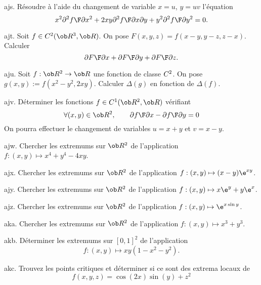 \exo [Level=2,Fight=2,Learn=1,Field=\EquationsAuxDérivéesPartielles,Type=\Exercices,Origin=] ajs. 
Résoudre à l'aide du changement de variable $x=u$, $y=uv$ l'équation 
$$
x^2{\partial^2f\F\partial x^2}+2xy{\partial^2f\F\partial x\partial y}+y^2{\partial^2f\F\partial y^2}=0.
$$


\exo [Level=2,Fight=0,Learn=0,Field=\FonctionsDePlusieursVariables,Type=\Exercices,Origin=] ajt. 
Soit $f\in\sc C^2(\ob R^3,\ob R)$. On pose $F(x,y,z)=f(x-y,y-z,z-x)$. Calculer
$$
{\partial F\F\partial x}+{\partial F\F\partial y}+{\partial F\F\partial z}.
$$

\exo [Level=2,Fight=0,Learn=0,Field=\FonctionsDePlusieursVariables,Type=\Exercices,Origin=] aju. 
Soit $f:\ob R^2\to\ob R$ une fonction de classe $\sc C^2$. On pose $g(x,y):=f(x^2-y^2,2xy)$. Calculer $\Delta(g)$ en fonction de $\Delta(f)$. 


\exo [Level=2,Fight=2,Learn=1,Field=\EquationsAuxDérivéesPartielles,Type=\Exercices,Origin=] ajv. 
Déterminer les fonctions $f\in\sc C^1(\ob R^2,\ob R)$ vérifiant 
$$
\forall (x,y)\in\ob R^2, \qquad {\partial f\F\partial x}-{\partial f\F\partial y}=0
$$
On pourra effectuer le changement de variables $u=x+y$ et $v=x-y$. 

\exo [Level=2,Fight=1,Learn=1,Field=\Extrema,Type=\Exercices,Origin=] ajw. 
Chercher les extremums sur $\ob R^2$ de l'application $f:(x,y)\mapsto x^4+y^4-4xy$. 


\exo [Level=2,Fight=1,Learn=1,Field=\Extrema,Type=\Exercices,Origin=] ajx. 
Chercher les extremums sur $\ob R^2$ de l'application $f:(x,y)\mapsto(x-y)\e^{xy}$. 


\exo [Level=2,Fight=1,Learn=1,Field=\Extrema,Type=\Exercices,Origin=] ajy. 
Chercher les extremums sur $\ob R^2$ de l'application $f:(x,y)\mapsto x\e^y+y\e^x$. 


\exo [Level=2,Fight=1,Learn=1,Field=\Extrema,Type=\Exercices,Origin=] ajz. 
Chercher les extremums sur $\ob R^2$ de l'application $f:(x,y)\mapsto\e^{x\sin y}$. 


\exo [Level=2,Fight=1,Learn=1,Field=\Extrema,Type=\Exercices,Origin=] aka. 
Chercher les extremums sur $\ob R^2$ de l'application $f:(x,y)\mapsto x^3+y^3$. 


\exo [Level=2,Fight=1,Learn=1,Field=\Extrema,Type=\Exercices,Origin=] akb. 
Déterminer les extremums sur $[0,1]^2$ de l'application 
$$
f:(x,y)\mapsto xy(1-x^2-y^2).
$$ 

\exo [Level=2,Fight=1,Learn=1,Field=\Extrema,Type=\Exercices,Origin=] akc. 
Trouvez les points critiques et déterminer si ce sont des extrema locaux de 
$$
f(x,y,z)=\cos(2x)\sin(y)+z^2
$$


